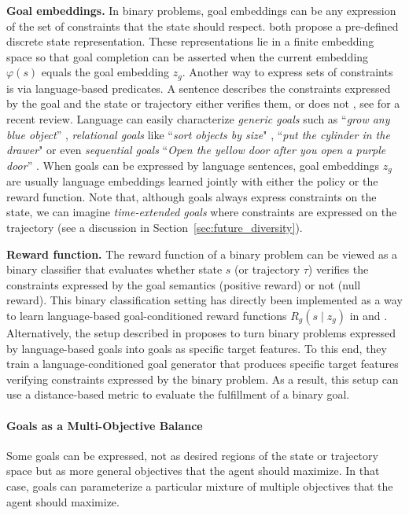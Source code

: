 \textbf{Goal embeddings.} In binary problems, goal embeddings can be any expression of the set of constraints
that the state should respect. \cite{akakzia2020decstr,ecoffet2020first} both propose a pre-defined discrete state representation. These representations lie in a finite embedding space so that goal completion can be asserted when the current embedding $\varphi(s)$ equals the goal embedding $z_g$. Another way to express sets of constraints is via language-based predicates. A sentence describes the constraints expressed by the goal and the state or trajectory
either verifies them, or does not \cite{Hermann2017,chan2019actrce,Jiang2019,bahdanau2018learning,bahdanau2018systematic,hill2019emergent,ther,imagine,lynch2020grounding}, see \cite{Luketina2019} for a recent review. Language can easily characterize \textit{generic goals} such as ``\textit{grow any blue object}'' \cite{imagine}, \textit{relational goals} like ``\textit{sort objects by size}" \cite{Jiang2019}, ``\textit{put the cylinder in the drawer}" \cite{lynch2020grounding} or even \textit{sequential goals} ``\textit{Open the yellow door after you open a purple door}'' \cite{chevalier-boisvert2018babyai}. When goals can be expressed by language sentences, goal embeddings $z_g$ are usually language embeddings learned jointly with either the policy or the reward function. Note that, although \rl goals always express constraints on the state, we can imagine \textit{time-extended goals} where constraints are expressed on the trajectory (see a discussion in Section~\ref{sec:future_diversity}).

\textbf{Reward function.} The reward function of a binary problem can be viewed as a binary classifier that evaluates whether state $s$ (or trajectory $\tau$) verifies the constraints expressed by the goal semantics (positive reward) or not (null reward). This binary classification setting has directly been implemented as a way to learn language-based goal-conditioned reward functions $R_g(s\mid z_g)$ in \cite{bahdanau2018learning} and \cite{imagine}. Alternatively, the setup described in \cite{colas2020language} proposes to turn binary problems expressed by language-based goals into goals as specific target features. To this end, they train a language-conditioned goal generator that produces specific target features verifying constraints expressed by the binary problem. As a result, this setup can use a distance-based metric to evaluate the fulfillment of a binary goal.

\paragraph{Goals as a Multi-Objective Balance}
Some goals can be expressed, not as desired regions of the state or trajectory space but as more general objectives that the agent should maximize. In that case, goals can parameterize a particular mixture of multiple objectives that the agent should maximize.

